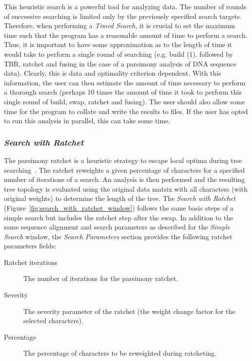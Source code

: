 {This heuristic search is a powerful tool for analyzing data. The number of rounds of successive searching is limited 
only by the previously specified search targets. Therefore, when performing a \emph{Timed Search}, it is crucial to 
set the maximum time such that the program has a reasonable amount of time to perform a search.  Thus, it is important 
to have some approximation as to the length of time it would take to perform a single round of searching (e.g. build (1), 
followed by TBR, ratchet and fusing in the case of a parsimony analysis of DNA sequence data).  Clearly, this is data 
and optimality criterion dependent.  With this information, the user can then estimate the amount of time necessary to 
perform a thorough search (perhaps 10 times the amount of time it took to perform this single round of build, swap, ratchet
and fusing).  The user should also allow some time for the program to collate and write the results to 
files.  If the user has opted to run this analysis in parallel, this can take some time.

\subsubsection*{\emph{Search with Ratchet}}

The parsimony ratchet is a heuristic strategy to escape  local optima during tree searching~\cite{Nixon1999}. The 
ratchet reweights a given percentage of characters for a specified number of iterations of a search. An analysis is 
then performed and the resulting tree topology is evaluated using the original data matrix with all characters (with original 
weights) to determine the length of the tree. The \emph{Search with Ratchet} (Figure~\ref{fig:search_with_ratchet_window}) 
follows the same basic steps of a simple search but includes the ratchet step after the swap. In addition to the same sequence 
alignment and search parameters as described for the \emph{Simple Search} window, the \emph{Search Parameters} section 
provides the following ratchet parameters fields:

\begin{description}
    \item[Ratchet iterations] The number of iterations for the parsimony
        ratchet.
    \item[Severity] The severity parameter of the ratchet (the weight
        change factor for the selected characters).
    \item[Percentage] The percentage of characters to be reweighted during ratcheting.
\end{description}

}
